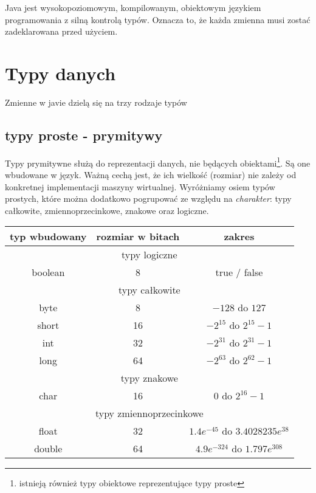\documentclass[11pt]{article}
\begin{document}

Java jest wysokopoziomowym, kompilowanym, obiektowym językiem programowania z silną kontrolą typów. Oznacza to, że każda zmienna musi zostać zadeklarowana przed użyciem. 

\section{Typy danych}
Zmienne w javie dzielą się na trzy rodzaje typów
\subsection{typy proste - prymitywy}
Typy prymitywne służą do reprezentacji danych, nie będących obiektami\footnote{istnieją również typy obiektowe reprezentujące typy proste}. Są one wbudowane w język. Ważną cechą jest, że ich wielkość (rozmiar) nie zależy od konkretnej implementacji maszyny wirtualnej. Wyróżniamy osiem typów prostych, które można dodatkowo pogrupować ze względu na \textit{charakter}: typy całkowite, zmiennoprzecinkowe, znakowe oraz logiczne.

\begin{table}[h]
\centering
\begin{tabular}{|c|c|c|} 
\hline \textbf{typ wbudowany} & \textbf{rozmiar w bitach} & \textbf{zakres} \\
\hline \multicolumn{3}{|c|}{typy logiczne} \\
\hline boolean & 8 & true / false \\
\hline \multicolumn{3}{|c|}{typy całkowite} \\
\hline byte & 8 & $-128$ do $127$ \\ 
\hline short & 16 & $-2^{15}$ do $2^{15}-1$ \\
\hline int & 32 & $-2^{31}$ do $2^{31}-1$ \\
\hline long & 64 & $-2^{63}$ do $2^{62}-1$ \\
\hline \multicolumn{3}{|c|}{typy znakowe} \\
\hline char & 16 & $0$ do $2^{16}-1$ \\
\hline \multicolumn{3}{|c|}{typy zmiennoprzecinkowe} \\
\hline float & 32 & $1.4e^{-45}$ do $3.4028235e^{38}$ \\
\hline double & 64 & $4.9e^{-324}$ do $1.797e^{308} $ \\

\hline
\end{tabular}
\end{table}
\end{document}
